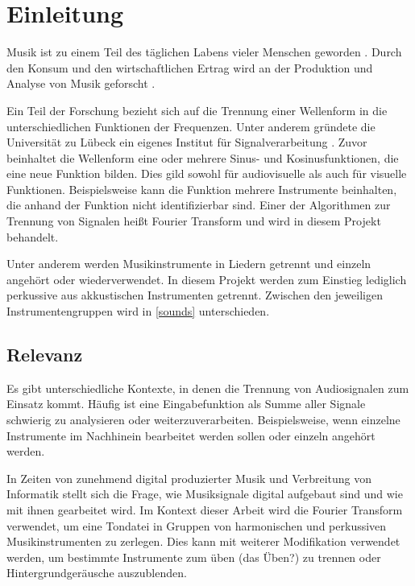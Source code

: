 \chapter{Einleitung}
%

Musik ist zu einem Teil des täglichen Labens vieler Menschen geworden \parencite{musiknutzung}. Durch den Konsum und den wirtschaftlichen Ertrag wird an der Produktion und Analyse von Musik geforscht \parencite{absatz}.

\par

Ein Teil der Forschung bezieht sich auf die Trennung einer Wellenform in die unterschiedlichen Funktionen der Frequenzen. Unter anderem gründete die Universität zu Lübeck ein eigenes Institut für Signalverarbeitung \parencite{institute_for_signal_processing}. Zuvor beinhaltet die Wellenform eine oder mehrere Sinus- und Kosinusfunktionen, die eine neue Funktion bilden. Dies gild sowohl für audiovisuelle als auch für visuelle Funktionen. Beispielsweise kann die Funktion mehrere Instrumente beinhalten, die anhand der Funktion nicht identifizierbar sind. Einer der Algorithmen zur Trennung von Signalen heißt Fourier Transform und wird in diesem Projekt behandelt.

\par

Unter anderem werden Musikinstrumente in Liedern getrennt und einzeln angehört oder wiederverwendet. In diesem Projekt werden zum Einstieg lediglich perkussive aus akkustischen Instrumenten getrennt. Zwischen den jeweiligen Instrumentengruppen wird in \cref{sounds} unterschieden.

%
\section{Relevanz}
%

Es gibt unterschiedliche Kontexte, in denen die Trennung von Audiosignalen zum Einsatz kommt. Häufig ist eine Eingabefunktion als Summe aller Signale schwierig zu analysieren oder weiterzuverarbeiten. Beispielsweise, wenn einzelne Instrumente im Nachhinein bearbeitet werden sollen oder einzeln angehört werden.

\par

In Zeiten von zunehmend digital produzierter Musik und Verbreitung von Informatik stellt sich die Frage, wie Musiksignale digital aufgebaut sind und wie mit ihnen gearbeitet wird. Im Kontext dieser Arbeit wird die Fourier Transform verwendet, um eine Tondatei in Gruppen von harmonischen und perkussiven Musikinstrumenten zu zerlegen. Dies kann mit weiterer Modifikation verwendet werden, um bestimmte Instrumente zum üben (das Üben?) zu trennen oder Hintergrundgeräusche auszublenden.

